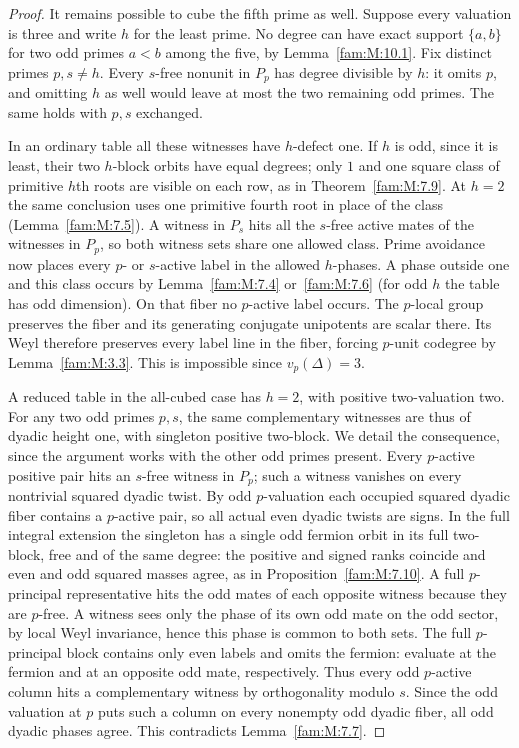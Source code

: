 \documentclass[11pt,a4paper]{article}
\numberwithin{equation}{section}
\theoremstyle{remark}
\begin{document}
\begin{proof}
It remains possible to cube the fifth prime as well. Suppose every
valuation is three and write $h$ for the least prime. No degree
can have exact support $\{a,b\}$ for two odd primes $a<b$ among
the five, by Lemma~\ref{fam:M:10.1}. Fix distinct primes
$p,s\ne h$. Every $s$-free nonunit in $P_p$ has degree divisible
by $h$: it omits $p$, and omitting $h$ as well would leave at
most the two remaining odd primes. The same holds with $p,s$
exchanged.

In an ordinary table all these witnesses have $h$-defect one.
If $h$ is odd, since it is least, their two $h$-block orbits
have equal degrees; only $1$ and one square class of primitive
$h$th roots are visible on each row, as in
Theorem~\ref{fam:M:7.9}. At $h=2$ the same conclusion uses one
primitive fourth root in place of the class
(Lemma~\ref{fam:M:7.5}). A witness in $P_s$ hits all the $s$-free
active mates of the witnesses in $P_p$, so both witness sets share
one allowed class. Prime avoidance now places every $p$- or
$s$-active label in the allowed $h$-phases. A phase outside one and this class occurs by Lemma~\ref{fam:M:7.4} or~\ref{fam:M:7.6} (for odd $h$ the table has odd dimension). On that fiber no $p$-active label occurs. The $p$-local group preserves the fiber and its generating conjugate unipotents are scalar there. Its Weyl therefore preserves every label line in the fiber, forcing $p$-unit codegree by Lemma~\ref{fam:M:3.3}. This is impossible since $v_p(\Delta)=3$.

A reduced table in the all-cubed case has $h=2$, with positive
two-valuation two. For any two odd primes $p,s$, the same
complementary witnesses are thus of dyadic height one, with
singleton positive two-block. We detail the consequence, since
the argument works with the other odd primes present. Every
$p$-active positive pair hits an $s$-free witness in $P_p$;
such a witness vanishes on every nontrivial squared dyadic twist.
By odd $p$-valuation each occupied squared dyadic fiber contains
a $p$-active pair, so all actual even dyadic twists are signs.
In the full integral extension the singleton has a single odd
fermion orbit in its full two-block, free and of the same degree:
the positive and signed ranks coincide and even and odd squared
masses agree, as in Proposition~\ref{fam:M:7.10}. A full
$p$-principal representative hits the odd mates of each opposite
witness because they are $p$-free. A witness sees only the phase
of its own odd mate on the odd sector, by local Weyl invariance,
hence this phase is common to both sets. The full $p$-principal
block contains only even labels and omits the fermion: evaluate
at the fermion and at an opposite odd mate, respectively. Thus
every odd $p$-active column hits a complementary witness by
orthogonality modulo $s$. Since the odd valuation at $p$ puts such
a column on every nonempty odd dyadic fiber, all odd dyadic
phases agree. This contradicts Lemma~\ref{fam:M:7.7}.
\end{proof}
\end{document}
